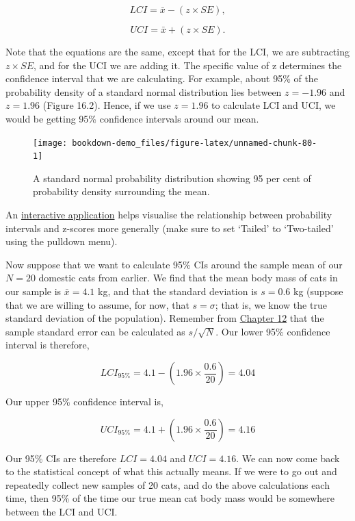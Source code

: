 \documentclass[
]{scrbook}
\begin{document}
\[LCI = \bar{x} - (z \times SE),\]

\[UCI = \bar{x} + (z \times SE).\]

Note that the equations are the same, except that for the LCI, we are subtracting \(z \times SE\), and for the UCI we are adding it.
The specific value of z determines the confidence interval that we are calculating.
For example, about 95\% of the probability density of a standard normal distribution lies between \(z = -1.96\) and \(z = 1.96\) (Figure 16.2).
Hence, if we use \(z = 1.96\) to calculate LCI and UCI, we would be getting 95\% confidence intervals around our mean.

\begin{figure}
\texttt{[image: bookdown-demo\_files/figure-latex/unnamed-chunk-80-1]} \caption{A standard normal probability distribution showing 95 per cent of probability density surrounding the mean.}\label{fig:unnamed-chunk-80}
\end{figure}

An \href{https://bradduthie.shinyapps.io/zandp/}{interactive application} helps visualise the relationship between probability intervals and z-scores more generally (make sure to set `Tailed' to `Two-tailed' using the pulldown menu).

Now suppose that we want to calculate 95\% CIs around the sample mean of our \(N = 20\) domestic cats from earlier.
We find that the mean body mass of cats in our sample is \(\bar{x} = 4.1\) kg, and that the standard deviation is \(s = 0.6\) kg (suppose that we are willing to assume, for now, that \(s = \sigma\); that is, we know the true standard deviation of the population).
Remember from \protect\hyperlink{Chapter_12}{Chapter 12} that the sample standard error can be calculated as \(s / \sqrt{N}\).
Our lower 95\% confidence interval is therefore,

\[LCI_{95\%} = 4.1 - \left(1.96 \times \frac{0.6}{20}\right) = 4.04\]

Our upper 95\% confidence interval is,

\[UCI_{95\%} = 4.1 + \left(1.96 \times \frac{0.6}{20}\right) = 4.16\]

Our 95\% CIs are therefore \(LCI = 4.04\) and \(UCI = 4.16\).
We can now come back to the statistical concept of what this actually means.
If we were to go out and repeatedly collect new samples of 20 cats, and do the above calculations each time, then 95\% of the time our true mean cat body mass would be somewhere between the LCI and UCI.
\end{document}
